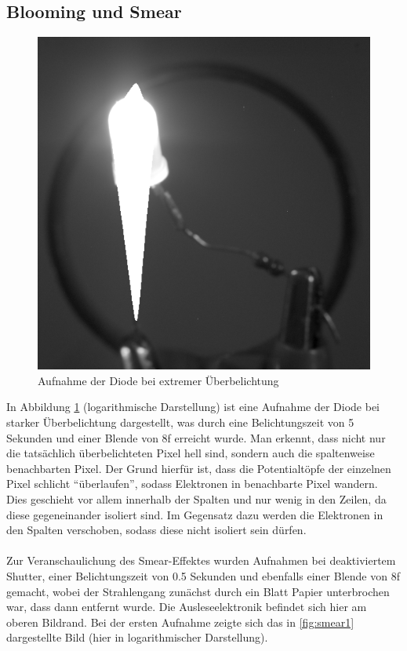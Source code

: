 \subsection{Blooming und Smear}
\begin{figure}[h!]
\centering
        \includegraphics[width=.4\textwidth]{blooming2.png}
\caption{ Aufnahme der Diode bei extremer Überbelichtung }
\label{fig:blooming}
\end{figure}
In Abbildung \ref{fig:blooming} (logarithmische Darstellung) ist eine Aufnahme der Diode bei starker Überbelichtung dargestellt, was durch eine Belichtungszeit von 5 Sekunden und einer Blende von 8f erreicht wurde. Man erkennt, dass nicht nur die tatsächlich überbelichteten Pixel hell sind, sondern auch die spaltenweise benachbarten Pixel. Der Grund hierfür ist, dass die Potentialtöpfe der einzelnen Pixel schlicht \enquote{überlaufen}, sodass Elektronen in benachbarte Pixel wandern. Dies geschieht vor allem innerhalb der Spalten und nur wenig in den Zeilen, da diese gegeneinander isoliert sind. Im Gegensatz dazu werden die Elektronen in den Spalten verschoben, sodass diese nicht isoliert sein dürfen. \\ \\
Zur Veranschaulichung des Smear-Effektes wurden Aufnahmen bei deaktiviertem Shutter, einer Belichtungszeit von 0.5 Sekunden und ebenfalls einer Blende von 8f gemacht, wobei der Strahlengang zunächst durch ein Blatt Papier unterbrochen war, dass dann entfernt wurde. Die Ausleseelektronik befindet sich hier am oberen Bildrand. 
Bei der ersten Aufnahme zeigte sich das in \ref{fig:smear1} dargestellte Bild (hier in logarithmischer Darstellung). 

